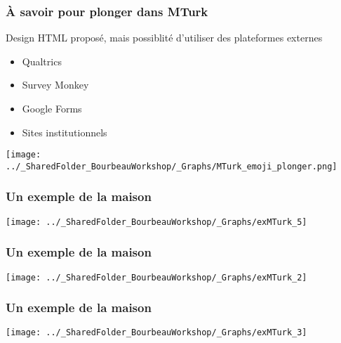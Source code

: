 \documentclass{beamer}
\begin{document}
    \begin{frame}
    
      \frametitle{À savoir pour plonger dans MTurk} \vspace{1cm}
      
      Design HTML proposé, mais possiblité d'utiliser des plateformes externes
       \begin{itemize}
          \item{Qualtrics}
          \item{Survey Monkey}
          \item{Google Forms}
          \item{Sites institutionnels}
        \end{itemize}
   
   \begin{flushright}
     	    \texttt{[image: ../\_SharedFolder\_BourbeauWorkshop/\_Graphs/MTurk\_emoji\_plonger.png]}
    \end{flushright} 
         
    \end{frame}  
   
        

     \begin{frame}
	        \frametitle{Un exemple de la maison} \vspace{1cm}   
	        \begin{center}
	           \texttt{[image: ../\_SharedFolder\_BourbeauWorkshop/\_Graphs/exMTurk\_5]}
	        \end{center}  
	    \end{frame}
    
     \begin{frame}
	        \frametitle{Un exemple de la maison} \vspace{1cm}   
	        \begin{center}
	           \texttt{[image: ../\_SharedFolder\_BourbeauWorkshop/\_Graphs/exMTurk\_2]}
	        \end{center}  
	    \end{frame}
    
     \begin{frame}
	        \frametitle{Un exemple de la maison} \vspace{1cm}   
	        \begin{center}
	           \texttt{[image: ../\_SharedFolder\_BourbeauWorkshop/\_Graphs/exMTurk\_3]}
	        \end{center}  
	    \end{frame}
    
\end{document}
